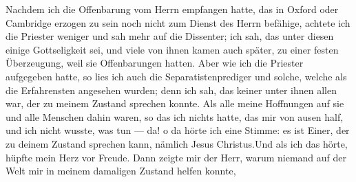 Nachdem ich die Offenbarung vom Herrn empfangen hatte,
\glqq das in Oxford oder Cambridge erzogen zu sein noch nicht zum
Dienst des Herrn befähige\grqq, achtete ich die Priester weniger und
sah mehr auf die Dissenter; ich sah, das unter diesen einige
Gottseligkeit sei, und viele von ihnen kamen auch später, zu einer
festen Überzeugung, weil sie Offenbarungen hatten. Aber wie
ich die Priester aufgegeben hatte, so lies ich auch die 
Separatistenprediger und solche, welche als die Erfahrensten angesehen
wurden; denn ich sah, das keiner unter ihnen allen war, der zu meinem
Zustand sprechen konnte. Als alle meine Hoffnungen auf sie und alle
Menschen dahin waren, so das ich nichts hatte, das mir von ausen
half, und ich nicht wusste, was tun — da! o da hörte ich eine
Stimme: \glqq es ist Einer, der zu deinem Zustand sprechen kann,
nämlich Jesus Christus.\grqq Und als ich das hörte, hüpfte mein
Herz vor Freude. Dann zeigte mir der Herr, warum niemand
auf der Welt mir in meinem damaligen Zustand helfen konnte,

